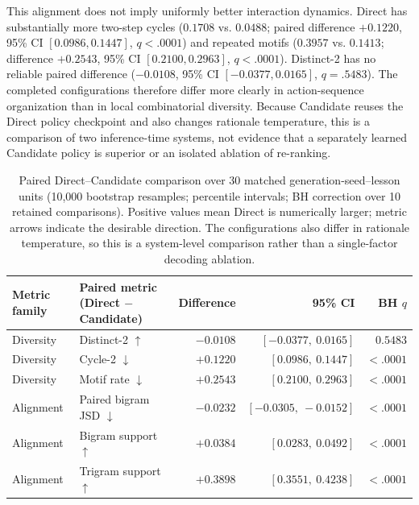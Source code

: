 \documentclass[manuscript,review,anonymous]{acmart}
\begin{document}
This alignment does not imply uniformly better interaction dynamics. Direct
has substantially more two-step cycles ($0.1708$ vs. $0.0488$; paired
difference $+0.1220$, 95\% CI $[0.0986,0.1447]$, $q<.0001$) and repeated
motifs ($0.3957$ vs. $0.1413$; difference $+0.2543$, 95\% CI
$[0.2100,0.2963]$, $q<.0001$). Distinct-2 has no reliable paired difference
($-0.0108$, 95\% CI $[-0.0377,0.0165]$, $q=.5483$). The completed
configurations therefore differ more clearly in action-sequence organization
than in local combinatorial diversity. Because Candidate reuses the Direct
policy checkpoint and also changes rationale temperature, this is a comparison
of two inference-time systems, not evidence that a separately learned Candidate
policy is superior or an isolated ablation of re-ranking.

\begin{table}[t]
\centering
\small
\setlength{\tabcolsep}{4pt}
\begin{tabular}{llrrr}
\toprule
Metric family & Paired metric (Direct $-$ Candidate) & Difference & 95\% CI & BH $q$ \\
\midrule
Diversity & Distinct-2 $\uparrow$ & $-0.0108$ & $[-0.0377,\ 0.0165]$ & $0.5483$ \\
Diversity & Cycle-2 $\downarrow$ & $+0.1220$ & $[0.0986,\ 0.1447]$ & $<.0001$ \\
Diversity & Motif rate $\downarrow$ & $+0.2543$ & $[0.2100,\ 0.2963]$ & $<.0001$ \\
Alignment & Paired bigram JSD $\downarrow$ & $-0.0232$ & $[-0.0305,\ -0.0152]$ & $<.0001$ \\
Alignment & Bigram support $\uparrow$ & $+0.0384$ & $[0.0283,\ 0.0492]$ & $<.0001$ \\
Alignment & Trigram support $\uparrow$ & $+0.3898$ & $[0.3551,\ 0.4238]$ & $<.0001$ \\
\bottomrule
\end{tabular}
\caption{Paired Direct--Candidate comparison over 30 matched generation-seed--lesson
units (10,000 bootstrap resamples; percentile intervals; BH correction over
10 retained comparisons). Positive values mean Direct is numerically larger; metric
arrows indicate the desirable direction. The configurations also differ in
rationale temperature, so this is a system-level comparison rather than a
single-factor decoding ablation.}
\label{tab:direct-candidate-paired}
\end{table}
\end{document}
